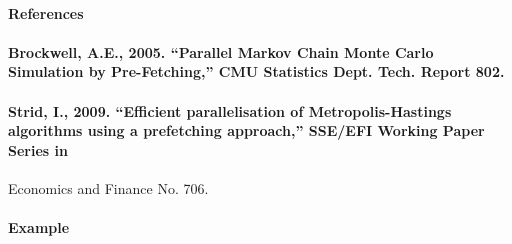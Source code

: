  \paragraph{References}
 
 \paragraph{Brockwell, A.E., 2005. ``Parallel Markov Chain Monte Carlo
 Simulation by Pre-Fetching,'' CMU Statistics Dept. Tech. Report 802.}
 
 \paragraph{Strid, I., 2009. ``Efficient parallelisation of
 Metropolis-Hastings algorithms using a prefetching approach,'' SSE/EFI
 Working Paper Series in}
 
 Economics and Finance No. 706.
 
 \paragraph{Example}


